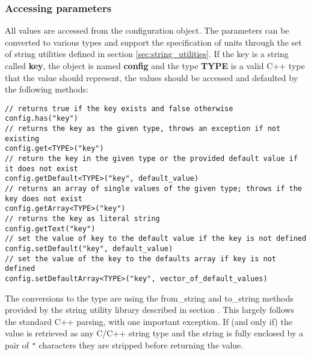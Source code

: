 \subsubsection{Accessing parameters}
All values are accessed from the configuration object. The parameters can be converted to various types and support the specification of units through the set of \apqs string utilities defined in section \ref{sec:string_utilities}. If the key is a string called \textbf{key}, the object is named \textbf{config} and the type \textbf{TYPE} is a valid C++ type that the value should represent, the values should be accessed and defaulted by the following methods:
\begin{verbatim}
// returns true if the key exists and false otherwise
config.has("key") 
// returns the key as the given type, throws an exception if not existing
config.get<TYPE>("key") 
// return the key in the given type or the provided default value if it does not exist
config.getDefault<TYPE>("key", default_value) 
// returns an array of single values of the given type; throws if the key does not exist
config.getArray<TYPE>("key")
// returns the key as literal string
config.getText("key") 
// set the value of key to the default value if the key is not defined
config.setDefault("key", default_value) 
// set the value of the key to the defaults array if key is not defined
config.setDefaultArray<TYPE>("key", vector_of_default_values)
\end{verbatim}

The conversions to the type are using the from\_string and to\_string methods provided by the string utility library described in section \needref. This largely follows the standard C++ parsing, with one important exception. If (and only if) the value is retrieved as any C/C++ string type and the string is fully enclosed by a pair of \texttt{"} characters they are stripped before returning the value. 

